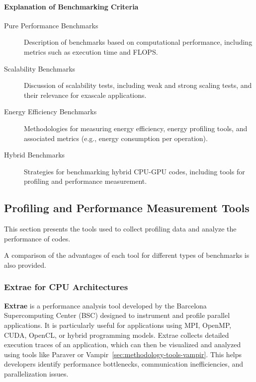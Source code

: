 \paragraph{Explanation of Benchmarking Criteria}
\begin{description}
    \item[Pure Performance Benchmarks] Description of benchmarks based on computational performance, including metrics such as execution time and FLOPS.

    \item[Scalability Benchmarks] Discussion of scalability tests, including weak and strong scaling tests, and their relevance for exascale applications.
    \item[Energy Efficiency Benchmarks]Methodologies for measuring energy efficiency, energy profiling tools, and associated metrics (e.g., energy consumption per operation).
    \item[Hybrid Benchmarks] Strategies for benchmarking hybrid CPU-GPU codes, including tools for profiling and performance measurement.
    
\end{description}

\subsection{Profiling and Performance Measurement Tools}
\label{sec:methodology-tools}
This section presents the tools used to collect profiling data and analyze the performance of codes. 

A comparison of the advantages of each tool for different types of benchmarks is also provided.



\subsubsection{Extrae for CPU Architectures}
\label{sec:methodology-tools-extrae}

\textbf{Extrae} is a performance analysis tool developed by the Barcelona Supercomputing Center (BSC) designed to instrument and profile parallel applications. 
It is particularly useful for applications using MPI, OpenMP, CUDA, OpenCL, or hybrid programming models. 
Extrae collects detailed execution traces of an application, which can then be visualized and analyzed using tools like Paraver or Vampir~\ref{sec:methodology-tools-vampir}.
 This helps developers identify performance bottlenecks, communication inefficiencies, and parallelization issues.

